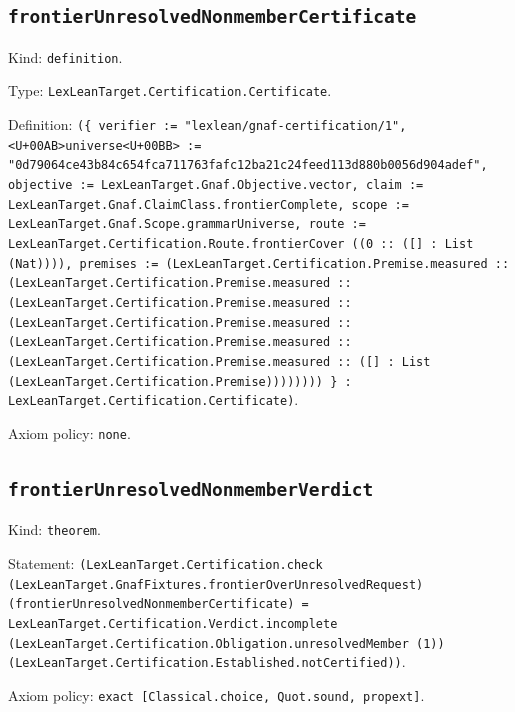 \documentclass[11pt]{article}
\begin{document}
\subsection*{\texttt{frontierUnresolvedNonmemberCertificate}}
\noindent Kind: \texttt{definition}.\par
\noindent Type: \texttt{LexLeanTarget.Certification.Certificate}.\par
\noindent Definition: \texttt{(\{ verifier := "lexlean/gnaf-certification/1", <U+00AB>universe<U+00BB> := "0d79064ce43b84c654fca711763fafc12ba21c24feed113d880b0056d904adef", objective := LexLeanTarget.Gnaf.Objective.vector, claim := LexLeanTarget.Gnaf.ClaimClass.frontierComplete, scope := LexLeanTarget.Gnaf.Scope.grammarUniverse, route := LexLeanTarget.Certification.Route.frontierCover ((0 :: ([] : List (Nat)))), premises := (LexLeanTarget.Certification.Premise.measured :: (LexLeanTarget.Certification.Premise.measured :: (LexLeanTarget.Certification.Premise.measured :: (LexLeanTarget.Certification.Premise.measured :: (LexLeanTarget.Certification.Premise.measured :: (LexLeanTarget.Certification.Premise.measured :: ([] : List (LexLeanTarget.Certification.Premise)))))))) \} : LexLeanTarget.Certification.Certificate)}.\par
\noindent Axiom policy: \texttt{none}.\par
\subsection*{\texttt{frontierUnresolvedNonmemberVerdict}}
\noindent Kind: \texttt{theorem}.\par
\noindent Statement: \texttt{(LexLeanTarget.Certification.check (LexLeanTarget.GnafFixtures.frontierOverUnresolvedRequest) (frontierUnresolvedNonmemberCertificate) = LexLeanTarget.Certification.Verdict.incomplete (LexLeanTarget.Certification.Obligation.unresolvedMember (1)) (LexLeanTarget.Certification.Established.notCertified))}.\par
\noindent Axiom policy: \texttt{exact [Classical.choice, Quot.sound, propext]}.\par
\end{document}
